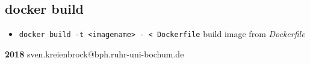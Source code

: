\documentclass[landscape]{article}
\begin{document}
\begin{multicols*}{3}
\section*{docker build}
\begin{itemize}
	\item \texttt{docker build -t <imagename> - < Dockerfile}
	\subitem \textsf{build image from \textit{Dockerfile}}
\end{itemize}

\vspace{1.5cm}
\begin{tcolorbox}[title=Cheatsheet]
	\textbf{2018}
	\textsf{sven.kreienbrock@bph.ruhr-uni-bochum.de}
\end{tcolorbox}

\end{multicols*}
\end{document}
